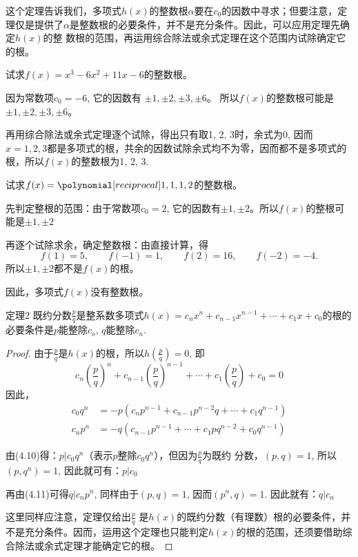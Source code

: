 这个定理告诉我们，多项式$h(x)$的整数根$\alpha$要在$c_0$的因数中寻求；但要注意，定理仅是提供了$\alpha$是整数根的必要条件，并不是充分条件。因此，可以应用定理先确定$h(x)$的整
数根的范围，再运用综合除法或余式定理在这个范围内试除确定它的根。

\begin{example}
    试求$f(x)=x^3-6x^2+11x-6$的整数根。
\end{example}

\begin{solution}
    因为常数项$c_0=-6$, 它的因数有
$\pm 1, \pm 2, \pm 3, \pm 6$。
所以$f(x)$的整数根可能是$\pm 1, \pm 2,\pm 3,\pm 6$。

再用综合除法或余式定理逐个试除，得出只有取1, 2, 3时，余式为0, 因而$x=1, 2, 3$都是多项式的根，共余的因数试除余式均不为零，因而都不是多项式的根，所以$f(x)$的整数根为1, 2, 3.
\end{solution}

\begin{example}
    试求$f(x)=\poly{1,1,1,2}$的整数根。
\end{example}

\begin{solution}
    先判定整根的范围：由于常数项$c_0=2$, 它的因数有$\pm 1,\pm 2$。所以$f(x)$的整根可能是$\pm 1,\pm 2$
    
    再逐个试除求余，确定整数根：由直接计算，得
\[f (1) =5,\qquad f (-1) =1,\qquad f (2) =16,\qquad f (-2) =-4.\]
所以$\pm 1,\pm 2$都不是$f(x)$的根。

因此，多项式$f(x)$没有整数根。
\end{solution}

\begin{blk}{定理2}
    既约分数$\frac{p}{q}$是整系数多项式$h (x) =c_nx^n+c_{n-1}x^{n-1}+\cdots+c_1x+c_0$的根的必要条件是$p$能整除$c_o$, $q$能整除$c_n$.
\end{blk}

\begin{proof}
    由于$\frac{p}{q}$是$h(x)$的根，所以$h\left(\frac{p}{q}\right)=0$, 即
\[c_n\left(\frac{p}{q}\right)^{n}+c_{n-1}\left(\frac{p}{q}\right)^{n-1}+\cdots +c_1\left(\frac{p}{q}\right)+c_0=0\]
因此，
\begin{align}
c_0q^n&= -p\left(c_np^{n-1}+c_{n-1}p^{n-2}q+\cdots+c_1q^{n-1}\right)\\
c_np^n&= -q\left(c_{n-1}p^{n-1}+\cdots+c_{1}pq^{n-2}+c_0q^{n-1}\right)   
\end{align}

由(4.10)得：$p|c_0q^n$（表示$p$整除$c_0q^n$），但因为$\frac{p}{q}$为既约
分数，$(p,q)=1$, 所以$(p,q^n)=1$, 因此就可有：$p|c_0$

再由(4.11)可得$q|c_np^n$, 同样由于$(p,q)=1$, 因而$(p^n,q)=1$. 因此就有：$q|c_n$

这里同样应注意，定理仅给出$\frac{p}{q}$
是$h(x)$的既约分数（有理数）根的必要条件，并不是充分条件。因而，运用这个定理也只能判定$h(x)$的根的范围，还须要借助综合除法或余式定理才能确定它的根。
\end{proof}


